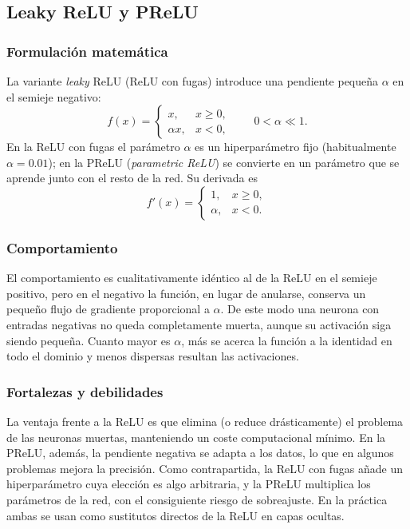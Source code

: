 \documentclass[12pt,a4paper]{article}
\begin{document}
\subsection{Leaky ReLU y PReLU}

\subsubsection{Formulación matemática}
La variante \emph{leaky} ReLU (ReLU con fugas) introduce una pendiente pequeña $\alpha$ en el semieje negativo:
\begin{equation*}
f(x) =
\begin{cases}
x, & x \geq 0,\\
\alpha x, & x < 0,
\end{cases}
\qquad 0 < \alpha \ll 1.
\end{equation*}
En la ReLU con fugas el parámetro $\alpha$ es un hiperparámetro fijo (habitualmente $\alpha = 0.01$); en la PReLU (\emph{parametric ReLU}) se convierte en un parámetro que se aprende junto con el resto de la red. Su derivada es
\begin{equation*}
f'(x) =
\begin{cases}
1, & x \geq 0,\\
\alpha, & x < 0.
\end{cases}
\end{equation*}

\subsubsection{Comportamiento}
El comportamiento es cualitativamente idéntico al de la ReLU en el semieje positivo, pero en el negativo la función, en lugar de anularse, conserva un pequeño flujo de gradiente proporcional a $\alpha$. De este modo una neurona con entradas negativas no queda completamente muerta, aunque su activación siga siendo pequeña. Cuanto mayor es $\alpha$, más se acerca la función a la identidad en todo el dominio y menos dispersas resultan las activaciones.

\subsubsection{Fortalezas y debilidades}
La ventaja frente a la ReLU es que elimina (o reduce drásticamente) el problema de las neuronas muertas, manteniendo un coste computacional mínimo. En la PReLU, además, la pendiente negativa se adapta a los datos, lo que en algunos problemas mejora la precisión. Como contrapartida, la ReLU con fugas añade un hiperparámetro cuya elección es algo arbitraria, y la PReLU multiplica los parámetros de la red, con el consiguiente riesgo de sobreajuste. En la práctica ambas se usan como sustitutos directos de la ReLU en capas ocultas.
\end{document}
